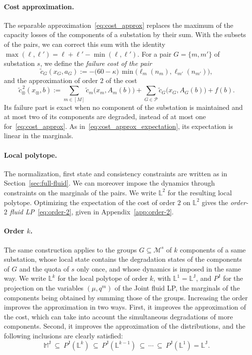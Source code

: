 \documentclass{article}
\begin{document}
\paragraph{Cost approximation.} The separable approximation~\eqref{eq:cost_approx} replaces the maximum of the
capacity losses of the components of a substation by their sum. With the subsets of the pairs, we can correct this sum
with the identity $\max(\ell, \ell') = \ell + \ell' - \min(\ell, \ell')$. For a pair $G = \{m, m'\}$ of substation
$s$, we define the \emph{failure cost of the pair}
\[
\tilde c_G(x_G, a_G) := -\big(60 - \kappa\big)\, \min\big(\ell_m(n_m), \ell_{m'}(n_{m'})\big),
\]
and the approximation of order $2$ of the cost
\[
\tilde c^{\,2}_\otimes(x_\otimes, b) := \sum_{m \in [M]} \tilde c_m\big(x_m, A_m(b)\big) + \sum_{G \in \mathcal{P}}
\tilde c_G\big(x_G, A_G(b)\big) + f(b).
\]
Its failure part is exact when no component of the substation is maintained and at most two of its components are
degraded, instead of at most one for~\eqref{eq:cost_approx}. As in~\eqref{eq:cost_approx_expectation}, its expectation
is linear in the marginals.

\paragraph{Local polytope.} The normalization, first state and consistency constraints are written as in
Section~\ref{sec:full-fluid}. We can moreover impose the dynamics through constraints
on the marginals of the pairs. We write $\mathbb{L}^2$ for the resulting local polytope. Optimizing the expectation of the cost of order $2$ on
$\mathbb{L}^2$ gives the \emph{order-$2$ fluid LP}~\eqref{eq:order-2}, given in Appendix~\ref{app:order-2}.

\paragraph{Order $k$.} The same construction applies to the groups $G \subseteq \mathcal{M}^s$ of $k$ components of a
same substation, whose local state contains the degradation states of the components of $G$ and the quota of $s$ only
once, and whose dynamics is imposed in the same way. We write $\mathbb{L}^k$ for the local polytope of order $k$, with
$\mathbb{L}^1 = \mathbb{L}^{\mathrm{J}}$, and $P^{\mathrm{J}}$ for the projection on the variables $(\mu, q^m)$ of the
Joint fluid LP, the marginals of the components being obtained by summing those of the groups. Increasing the order
improves the approximation in two ways. First, it improves the approximation of the cost, which can take into account
the simultaneous degradations of more components. Second, it improves the approximation of the distributions, and 
the following inclusions are clearly satisfied:
\begin{equation}
\label{eq:order-k-nested}
\mathbb{M}^{\mathrm{J}} \ \subseteq\ P^{\mathrm{J}}(\mathbb{L}^k) \ \subseteq\ P^{\mathrm{J}}(\mathbb{L}^{k-1}) \ \subseteq\ \cdots
\ \subseteq\ P^{\mathrm{J}}(\mathbb{L}^1) = \mathbb{L}^{\mathrm{J}}.
\end{equation}
\end{document}
